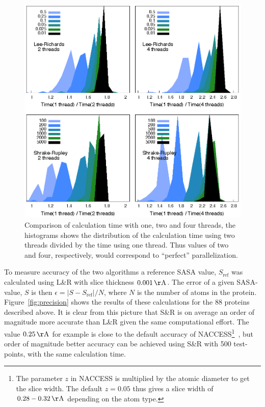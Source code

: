 \documentclass[a4paper,11pt]{article}
\begin{document}
\begin{small}
\begin{figure}
\begin{center}
  \includegraphics{fig/threads} 
  \caption{Comparison of calculation time with one, two and four
    threads, the histograms shows the distribution of the calculation
    time using two threads divided by the time using one thread. Thus
    values of two and four, respectively, would correspond to
    ``perfect'' parallelization.
    \label{fig:threads}}
  \end{center}
\end{figure}

To measure accuracy of the two algorithms a reference SASA value,
$S_\text{ref}$ was calculated using L\&R with slice thickness
$0.001\,\mathrm{\AA}$. The error of a given SASA-value, $S$ is then
$\epsilon = \lvert S - S_\text{ref} \rvert / N$, where $N$ is the
number of atoms in the protein. Figure~\ref{fig:precision} shows the
results of these calculations for the 88 proteins described above.  It
is clear from this picture that S\&R is on average an order of
magnitude more accurate than L\&R given the same computational effort.
The value $0.25\,\mathrm{\AA}$ for example is close to the default
accuracy of NACCESS\footnote{The parameter $z$ in NACCESS is
  multiplied by the atomic diameter to get the slice width. The
  default $z=0.05$ thus gives a slice width of $0.28 -
  0.32\,\mathrm{\AA}$ depending on the atom type.}~\cite{NACCESS}, but
order of magnitude better accuracy can be achieved using S\&R with 500
test-points, with the same calculation time.



\end{small}
\end{document}
